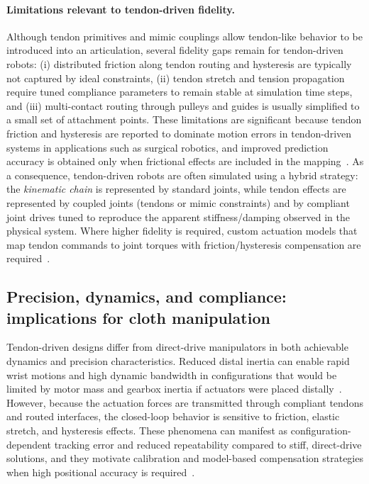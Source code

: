 \paragraph{Limitations relevant to tendon-driven fidelity.}
Although tendon primitives and mimic couplings allow tendon-like behavior to be introduced into an articulation, several fidelity gaps remain for tendon-driven robots:
(i) distributed friction along tendon routing and hysteresis are typically not captured by ideal constraints, (ii) tendon stretch and tension propagation require tuned compliance parameters to remain stable at simulation time steps, and (iii) multi-contact routing through pulleys and guides is usually simplified to a small set of attachment points. These limitations are significant because tendon friction and hysteresis are reported to dominate motion errors in tendon-driven systems in applications such as surgical robotics, and improved prediction accuracy is obtained only when frictional effects are included in the mapping~\cite{Kato2016Neuroendoscopy,Miyasaka2020HysteresisFriction}.
As a consequence, tendon-driven robots are often simulated using a hybrid strategy: the \emph{kinematic chain} is represented by standard joints, while tendon effects are represented by coupled joints (tendons or mimic constraints) and by compliant joint drives tuned to reproduce the apparent stiffness/damping observed in the physical system. Where higher fidelity is required, custom actuation models that map tendon commands to joint torques with friction/hysteresis compensation are required~\cite{Miyasaka2020HysteresisFriction}. %

\subsection{Precision, dynamics, and compliance: implications for cloth manipulation}

Tendon-driven designs differ from direct-drive manipulators in both achievable dynamics and precision characteristics. Reduced distal inertia can enable rapid wrist motions and high dynamic bandwidth in configurations that would be limited by motor mass and gearbox inertia if actuators were placed distally~\cite{Nemoto2022CableWrist}. However, because the actuation forces are transmitted through compliant tendons and routed interfaces, the closed-loop behavior is sensitive to friction, elastic stretch, and hysteresis effects. These phenomena can manifest as configuration-dependent tracking error and reduced repeatability compared to stiff, direct-drive solutions, and they motivate calibration and model-based compensation strategies when high positional accuracy is required~\cite{Miyasaka2020HysteresisFriction,Kato2016Neuroendoscopy}.

